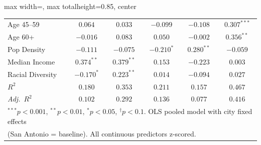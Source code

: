\begin{table}[htbp]
\begin{adjustbox}{max width=\linewidth, max totalheight=0.85\textheight, center}
\begin{tabular}{lccccc}
Age 45--59 & $0.064$ & $0.033$ & $-0.099$ & $-0.108$ & $0.307^{***}$ \\
Age 60+ & $-0.016$ & $0.083$ & $0.050$ & $-0.002$ & $0.356^{**}$ \\
Pop Density & $-0.111$ & $-0.075$ & $-0.210^{*}$ & $0.280^{**}$ & $-0.059$ \\
Median Income & $0.374^{**}$ & $0.379^{**}$ & $0.153$ & $-0.223$ & $0.003$ \\
Racial Diversity & $-0.170^{*}$ & $0.223^{**}$ & $0.014$ & $-0.094$ & $0.027$ \\
\midrule
$R^2$ & $0.180$ & $0.353$ & $0.211$ & $0.157$ & $0.467$ \\
\textit{Adj.}\ $R^2$ & $0.102$ & $0.292$ & $0.136$ & $0.077$ & $0.416$ \\
\bottomrule
\multicolumn{6}{l}{\scriptsize $^{***}p<0.001$, $^{**}p<0.01$, $^{*}p<0.05$, $^{\dagger}p<0.1$. OLS pooled model with city fixed effects} \\
\multicolumn{6}{l}{\scriptsize (San Antonio = baseline). All continuous predictors z-scored.} \\
\end{tabular}
\end{adjustbox}
\end{table}
